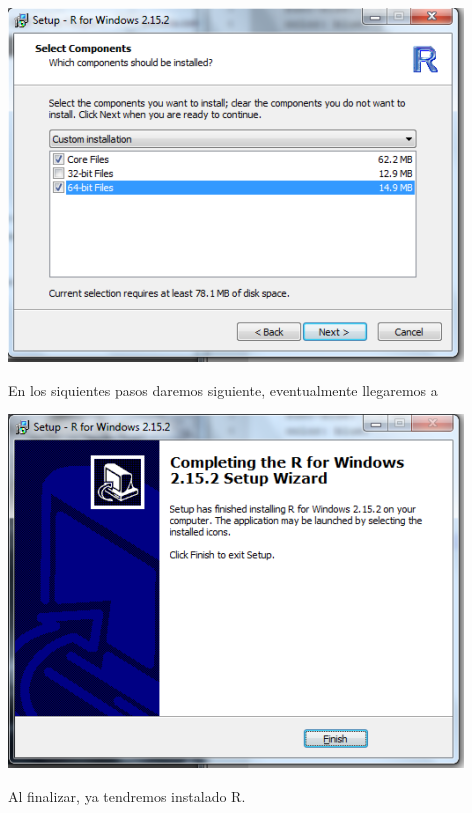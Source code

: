 \documentclass[12pt,hidelinks]{article}
\begin{document}
	\begin{center}
		\includegraphics[scale=0.9]{images/1/install3-3.png}
	\end{center}
	En los siquientes pasos daremos siguiente, eventualmente llegaremos a
	\begin{center}
		\includegraphics[scale=0.9]{images/1/install3-4.png}
	\end{center}
	Al finalizar, ya tendremos instalado R.
\end{document}
